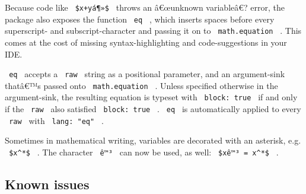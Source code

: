 \pandocbounded{}

Because code like \texttt{\ \$x+yá¶»\$\ } throws an â€œunknown
variableâ€? error, the package also exposes the function \texttt{\ eq\ }
, which inserts spaces before every superscript- and subscript-character
and passing it on to \texttt{\ math.equation\ } . This comes at the cost
of missing syntax-highlighting and code-suggestions in your IDE.

\texttt{\ eq\ } accepts a \texttt{\ raw\ } string as a positional
parameter, and an argument-sink thatâ€™s passed onto
\texttt{\ math.equation\ } . Unless specified otherwise in the
argument-sink, the resulting equation is typeset with
\texttt{\ block:\ true\ } if and only if the \texttt{\ raw\ } also
satisfied \texttt{\ block:\ true\ } . \texttt{\ eq\ } is automatically
applied to every \texttt{\ raw\ } with \texttt{\ lang:\ "eq"\ } .

\begin{Shaded}
\begin{Highlighting}[]

\NormalTok{\textasciigrave{}\textasciigrave{}\textasciigrave{})}


\NormalTok{\textasciigrave{}\textasciigrave{}\textasciigrave{}}
\end{Highlighting}
\end{Shaded}

\pandocbounded{}

Sometimes in mathematical writing, variables are decorated with an
asterisk, e.g. \texttt{\ \$x\^{}*\$\ } . The character \texttt{\ ê™³\ }
can now be used, as well: \texttt{\ \$xê™³\ =\ x\^{}*\$\ } .

\subsection{Known issues}\label{known-issues}


